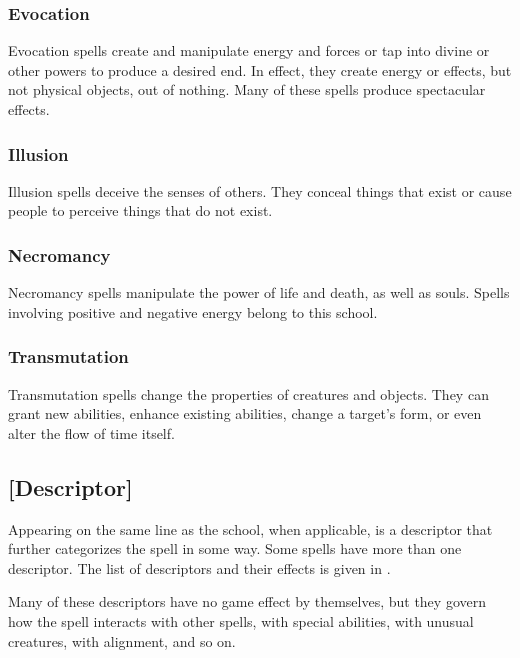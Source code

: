\subsubsection{Evocation}
Evocation spells create and manipulate energy and forces or tap into divine or other powers to produce a desired end. In effect, they create energy or effects, but not physical objects, out of nothing. Many of these spells produce spectacular effects.

\subsubsection{Illusion}
Illusion spells deceive the senses of others. They conceal things that exist or cause people to perceive things that do not exist.

\subsubsection{Necromancy}
Necromancy spells manipulate the power of life and death, as well as souls. Spells involving positive and negative energy belong to this school.

\subsubsection{Transmutation}
Transmutation spells change the properties of creatures and objects. They can grant new abilities, enhance existing abilities, change a target's form, or even alter the flow of time itself.

\subsection{[Descriptor]}
Appearing on the same line as the school, when applicable, is a descriptor that further categorizes the spell in some way. Some spells have more than one descriptor. The list of descriptors and their effects is given in .

Many of these descriptors have no game effect by themselves, but they govern how the spell interacts with other spells, with special abilities, with unusual creatures, with alignment, and so on.

